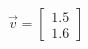 \documentclass[preview]{standalone}
\begin{document}
\begin{align*}
\vec{v}=\begin{bmatrix}1.5\\1.6\end{bmatrix}
\end{align*}
\end{document}
